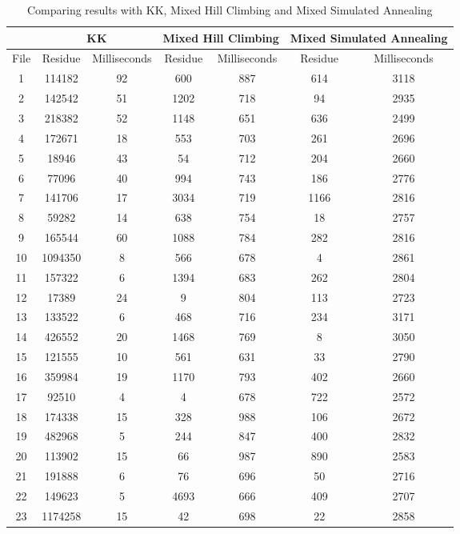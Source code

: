 \documentclass[tikz, 12pt]{scrartcl}
\begin{document}
\begin{longtable}{|c|cc|cc|cc|}
\caption{Comparing results with KK,  Mixed Hill Climbing and Mixed Simulated Annealing\label{kkMixedHillMixedSimulated}}\\
\hline
 	 & \multicolumn{2}{c}{ KK} 	 & \multicolumn{2}{c}{ Mixed Hill Climbing} 	 & \multicolumn{2}{c|}{ Mixed Simulated Annealing} \\
\hline
File	 & Residue 	 & 	 Milliseconds	 & Residue 	 & 	 Milliseconds	 & Residue 	 & 	 Milliseconds\\
\hline
1	 &114182	 & 	92	 &600	 & 	887	 &614	 & 	3118\\
2	 &142542	 & 	51	 &1202	 & 	718	 &94	 & 	2935\\
3	 &218382	 & 	52	 &1148	 & 	651	 &636	 & 	2499\\
4	 &172671	 & 	18	 &553	 & 	703	 &261	 & 	2696\\
5	 &18946	 & 	43	 &54	 & 	712	 &204	 & 	2660\\
6	 &77096	 & 	40	 &994	 & 	743	 &186	 & 	2776\\
7	 &141706	 & 	17	 &3034	 & 	719	 &1166	 & 	2816\\
8	 &59282	 & 	14	 &638	 & 	754	 &18	 & 	2757\\
9	 &165544	 & 	60	 &1088	 & 	784	 &282	 & 	2816\\
10	 &1094350	 & 	8	 &566	 & 	678	 &4	 & 	2861\\
11	 &157322	 & 	6	 &1394	 & 	683	 &262	 & 	2804\\
12	 &17389	 & 	24	 &9	 & 	804	 &113	 & 	2723\\
13	 &133522	 & 	6	 &468	 & 	716	 &234	 & 	3171\\
14	 &426552	 & 	20	 &1468	 & 	769	 &8	 & 	3050\\
15	 &121555	 & 	10	 &561	 & 	631	 &33	 & 	2790\\
16	 &359984	 & 	19	 &1170	 & 	793	 &402	 & 	2660\\
17	 &92510	 & 	4	 &4	 & 	678	 &722	 & 	2572\\
18	 &174338	 & 	15	 &328	 & 	988	 &106	 & 	2672\\
19	 &482968	 & 	5	 &244	 & 	847	 &400	 & 	2832\\
20	 &113902	 & 	15	 &66	 & 	987	 &890	 & 	2583\\
21	 &191888	 & 	6	 &76	 & 	696	 &50	 & 	2716\\
22	 &149623	 & 	5	 &4693	 & 	666	 &409	 & 	2707\\
23	 &1174258	 & 	15	 &42	 & 	698	 &22	 & 	2858\\

\end{longtable}
\end{document}

